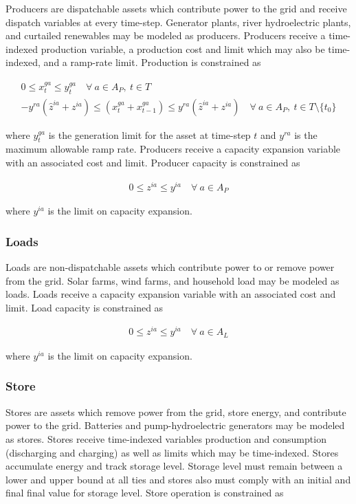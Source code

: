 Producers are dispatchable assets which contribute power to the grid and receive dispatch variables at every time-step. Generator plants, river hydroelectric plants, and curtailed renewables may be modeled as producers. Producers receive a time-indexed production variable, a production cost and limit which may also be time-indexed, and a ramp-rate limit. Production is constrained as

\begin{gather}
	0 \leq x^{ga}_t \leq y^{ga}_t\quad \forall\ a \in A_P,\ t \in T \\
	-y^{ra} \left(\hat{z}^{ia} + z^{ia}\right) \leq \left(x^{ga}_t + x^{ga}_{t - 1}\right) \leq y^{ra} \left(\hat{z}^{ia} + z^{ia}\right)\quad \forall\ a \in A_P,\ t \in T \setminus \{t_0\}
\end{gather}

where $y^{ga}_t$ is the generation limit for the asset at time-step $t$ and $y^{ra}$ is the maximum allowable ramp rate. Producers receive a capacity expansion variable with an associated cost and limit. Producer capacity is constrained as

\begin{gather}
	0 \leq z^{ia} \leq y^{ia}\quad \forall\ a \in A_P
\end{gather}

where $y^{ia}$ is the limit on capacity expansion.

\subsubsection{Loads}

Loads are non-dispatchable assets which contribute power to or remove power from the grid. Solar farms, wind farms, and household load may be modeled as loads. Loads receive a capacity expansion variable with an associated cost and limit. Load capacity is constrained as

\begin{gather}
	0 \leq z^{ia} \leq y^{ia}\quad \forall\ a \in A_L
\end{gather}

where $y^{ia}$ is the limit on capacity expansion.

\subsubsection{Store}

Stores are assets which remove power from the grid, store energy, and contribute power to the grid. Batteries and pump-hydroelectric generators may be modeled as stores. Stores receive time-indexed variables production and consumption (discharging and charging) as well as limits which may be time-indexed. Stores accumulate energy and track storage level. Storage level must remain between a lower and upper bound at all ties and stores also must comply with an initial and final final value for storage level. Store operation is constrained as

